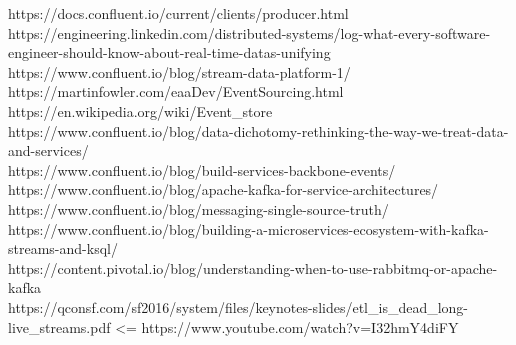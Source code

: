 \documentclass[]{article}
\begin{document}
https://docs.confluent.io/current/clients/producer.html\\
https://engineering.linkedin.com/distributed-systems/log-what-every-software-engineer-should-know-about-real-time-datas-unifying
https://www.confluent.io/blog/stream-data-platform-1/
https://martinfowler.com/eaaDev/EventSourcing.html\\
https://en.wikipedia.org/wiki/Event\_store\\
https://www.confluent.io/blog/data-dichotomy-rethinking-the-way-we-treat-data-and-services/\\
https://www.confluent.io/blog/build-services-backbone-events/\\
https://www.confluent.io/blog/apache-kafka-for-service-architectures/\\
https://www.confluent.io/blog/messaging-single-source-truth/\\
https://www.confluent.io/blog/building-a-microservices-ecosystem-with-kafka-streams-and-ksql/\\
https://content.pivotal.io/blog/understanding-when-to-use-rabbitmq-or-apache-kafka\\
https://qconsf.com/sf2016/system/files/keynotes-slides/etl\_is\_dead\_long-live\_streams.pdf
\textless{}= https://www.youtube.com/watch?v=I32hmY4diFY
\end{document}

